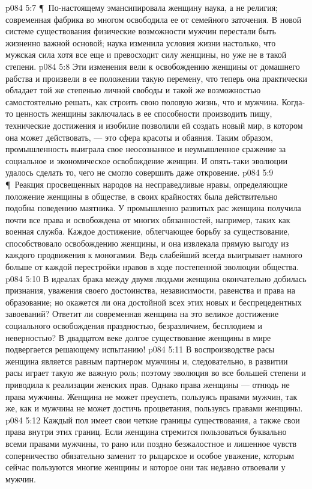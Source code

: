 \vs p084 5:7 \P\ По\hyp{}настоящему эмансипировала женщину наука, а не религия; современная фабрика во многом освободила ее от семейного заточения. В новой системе существования физические возможности мужчин перестали быть жизненно важной основой; наука изменила условия жизни настолько, что мужская сила хотя все еще и превосходит силу женщины, но уже не в такой степени.
\vs p084 5:8 Эти изменения вели к освобождению женщины от домашнего рабства и произвели в ее положении такую перемену, что теперь она практически обладает той же степенью личной свободы и такой же возможностью самостоятельно решать, как строить свою половую жизнь, что и мужчина. Когда\hyp{}то ценность женщины заключалась в ее способности производить пищу, технические достижения и изобилие позволили ей создать новый мир, в котором она может действовать, --- это сфера красоты и обаяния. Таким образом, промышленность выиграла свое неосознанное и неумышленное сражение за социальное и экономическое освобождение женщин. И опять\hyp{}таки эволюции удалось сделать то, чего не смогло совершить даже откровение.
\vs p084 5:9 \P\ Реакция просвещенных народов на несправедливые нравы, определяющие положение женщины в обществе, в своих крайностях была действительно подобна поведению маятника. У промышленно развитых рас женщина получила почти все права и освобождена от многих обязанностей, например, таких как военная служба. Каждое достижение, облегчающее борьбу за существование, способствовало освобождению женщины, и она извлекала прямую выгоду из каждого продвижения к моногамии. Ведь слабейший всегда выигрывает намного больше от каждой перестройки нравов в ходе постепенной эволюции общества.
\vs p084 5:10 В идеалах брака между двумя людьми женщина окончательно добилась признания, уважения своего достоинства, независимости, равенства и права на образование; но окажется ли она достойной всех этих новых и беспрецедентных завоеваний? Ответит ли современная женщина на это великое достижение социального освобождения праздностью, безразличием, бесплодием и неверностью? В двадцатом веке долгое существование женщины в мире подвергается решающему испытанию!
\vs p084 5:11 В воспроизводстве расы женщина является равным партнером мужчины и, следовательно, в развитии расы играет такую же важную роль; поэтому эволюция во все большей степени и приводила к реализации женских прав. Однако права женщины --- отнюдь не права мужчины. Женщина не может преуспеть, пользуясь правами мужчин, так же, как и мужчина не может достичь процветания, пользуясь правами женщины.
\vs p084 5:12 Каждый пол имеет свои четкие границы существования, а также свои права внутри этих границ. Если женщина стремится пользоваться буквально всеми правами мужчины, то рано или поздно безжалостное и лишенное чувств соперничество обязательно заменит то рыцарское и особое уважение, которым сейчас пользуются многие женщины и которое они так недавно отвоевали у мужчин.
